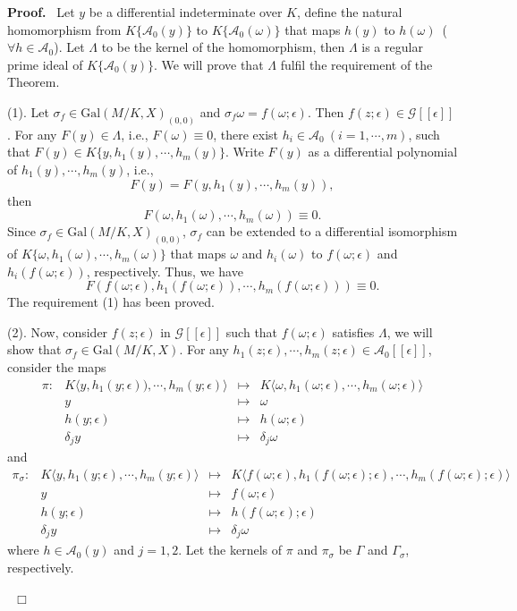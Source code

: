 \documentclass[preprint, 12pt]{elsarticle}
\numberwithin{equation}{section}
\newenvironment{proof}[1][Proof]{\textbf{#1.}\ }{\ $\Box$}
\newcommand{\A}{\mathcal{A}}
\newcommand{\G}{\mathcal{G}}
\newcommand{\Gal}{\mathrm{Gal}}
\newcommand{\CA}{\G[[\epsilon]]}
\begin{document}
\begin{proof}
Let $y$ be a differential indeterminate over $K$, define the
natural homomorphism from $K\{\A_0(y)\}$ to $K\{\A_0(\omega)\}$
that maps $h(y)$ to $h(\omega)$\ ($\forall h\in \A_0$). Let
$\Lambda$ to be the kernel of the homomorphism, then $\Lambda$ is
a regular prime ideal of $K\{\A_0(y)\}$. We will prove that
$\Lambda$ fulfil the requirement of the Theorem.

(1). Let $\sigma_f\in \Gal(M/K,X)_{(0,0)}$ and $\sigma_f\omega =
f(\omega;\epsilon)$. Then $f(z;\epsilon)\in \G[[\epsilon]]$. For
any $F(y)\in \Lambda$, i.e., $F(\omega) \equiv 0$, there exist
$h_i\in\A_0\ (i = 1,\cdots, m)$, such that $F(y)\in K\{y,
h_1(y),\cdots,h_m(y)\}$. Write $F(y)$ as a differential
polynomial of $h_1(y), \cdots, h_m(y)$, i.e.,
$$F(y) = F(y, h_1(y),\cdots,h_m(y)),$$
then
$$F(\omega, h_1(\omega),\cdots,h_m(\omega)) \equiv 0.$$
Since $\sigma_f\in \Gal(M/K,X)_{(0,0)}$, $\sigma_f$ can be
extended to a differential isomorphism of $K\{\omega, h_1(\omega),
\cdots, h_m(\omega)\}$ that maps $\omega$ and $h_i(\omega)$ to
$f(\omega;\epsilon)$ and $h_i(f(\omega;\epsilon))$, respectively.
Thus, we have
$$F(f(\omega;\epsilon), h_1(f(\omega;\epsilon)), \cdots,
h_m(f(\omega;\epsilon))) \equiv 0.$$ 
The requirement (1) has been proved.

(2). Now, consider $f(z;\epsilon)$ in $\CA$ such that
$f(\omega;\epsilon)$ satisfies $\Lambda$, we will show that $\sigma_f\in \Gal(M/K,X)$. For any
$h_1(z;\epsilon), \cdots, h_m(z;\epsilon)\in \A_0[[\epsilon]]$,
consider the maps
$$\begin{array}{cccc}
\pi: &K\langle y, h_1(y;\epsilon)), \cdots,
h_m(y;\epsilon)\rangle&\mapsto &
K\langle \omega, h_1(\omega;\epsilon), \cdots, h_m(\omega;\epsilon)\rangle\\
&y&\mapsto&\omega\\
&h(y;\epsilon)&\mapsto& h(\omega;\epsilon)\\
&\delta_jy&\mapsto&\delta_j\omega
\end{array}
$$
and
$$\begin{array}{cccc}
\pi_\sigma: &K\langle y, h_1(y;\epsilon), \cdots,
h_m(y;\epsilon)\rangle&\mapsto &
K\langle f(\omega;\epsilon), h_1(f(\omega;\epsilon);\epsilon), \cdots, h_m(f(\omega;\epsilon);\epsilon)\rangle\\
&y&\mapsto& f(\omega;\epsilon)\\
&h(y;\epsilon)&\mapsto& h(f(\omega;\epsilon);\epsilon)\\
&\delta_jy&\mapsto&\delta_j\omega
\end{array}
$$
where $h\in \A_0(y)$ and $j = 1,2$. Let the kernels of $\pi$ and
$\pi _\sigma$ be $\Gamma$ and $\Gamma_\sigma$, respectively.


\end{proof}
\end{document}
